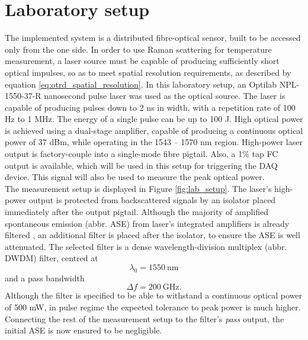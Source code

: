 \documentclass{standalone}
\begin{document}
\chapter{Laboratory setup} \label{ch:setup}
\setcounter{page}\thestranica


The implemented system is a distributed fibre-optical sensor, built to be accessed only from the one side. In order to use Raman scattering for temperature measurement, a laser source must be capable of producing sufficiently short optical impulses, so as to meet spatial resolution requirements, as described by equation \ref{eq:otrd_spatial_resolution}. In this laboratory setup, an Optilab NPL-1550-37-R nanosecond pulse laser was used as the optical source. The laser is capable of producing pulses down to 2 ns in width, with a repetition rate of 100 Hz to 1 MHz. The energy of a single pulse can be up to 100 \textmu J. High optical power is achieved using a dual-stage amplifier, capable of producing a continuous optical power of 37 dBm, while operating in the 1543 -- 1570 nm region. High-power laser output is factory-couple into a single-mode fibre pigtail. Also, a 1\% tap FC output is available, which will be used in this setup for triggering the DAQ device. This signal will also be used to measure the peak optical power. \\

The measurement setup is displayed in Figure \ref{fig:lab_setup}.
The laser's high-power output is protected from backscattered signals by an isolator placed immediately after the output pigtail. Although the majority of amplified spontaneous emission (abbr. ASE) from laser's integrated amplifiers is already filtered \cite{datasheet:laser}, an additional filter is placed after the isolator, to ensure the ASE is well attenuated. The selected filter is a dense wavelength-division multiplex (abbr. DWDM) filter, centred at \cite{datasheet:dwdm_filter}
\begin{equation}
\label{eq:dwdm_filter_centre}
\lambda_0 = \SI{1550}{\nano \meter}
\end{equation} and a pass bandwidth 
\begin{equation}
\label{eq:dwdm_filter_bw}
\varDelta f = \SI{200}{\giga \hertz} \textrm{.}
\end{equation}
Although the filter is specified to be able to withstand a continuous optical power of 500 mW, in pulse regime the expected tolerance to peak power is much higher. Connecting the rest of the measurement setup to the filter's \textit{pass} output, the initial ASE is now ensured to be negligible. \\
\end{document}
